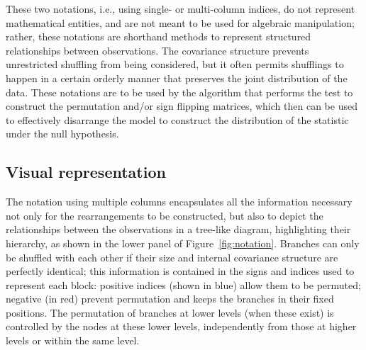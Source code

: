 These two notations, i.e., using single- or multi-column indices, do not represent mathematical entities, and are not meant to be used for algebraic manipulation; rather, these notations are shorthand methods to represent structured relationships between observations. The covariance structure prevents unrestricted shuffling from being considered, but it often permits shufflings to happen in a certain orderly manner that preserves the joint distribution of the data. These notations are to be used by the algorithm that performs the test to construct the permutation and/or sign flipping matrices, which then can be used to effectively disarrange the model to construct the distribution of the statistic under the null hypothesis.

\subsection{Visual representation}

The notation using multiple columns encapsulates all the information necessary not only for the rearrangements to be constructed, but also to depict the relationships between the observations in a tree-like diagram, highlighting their hierarchy, as shown in the lower panel of Figure~\ref{fig:notation}. Branches can only be shuffled with each other if their size and internal covariance structure are perfectly identical; this information is contained in the signs and indices used to represent each block: positive indices (shown in blue) allow them to be permuted; negative (in red) prevent permutation and keeps the branches in their fixed positions. The permutation of branches at lower levels (when these exist) is controlled by the nodes at these lower levels, independently from those at higher levels or within the same level.


